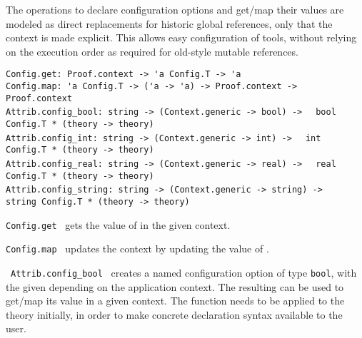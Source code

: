 \begin{isabellebody}
\begin{isamarkuptext}
  The operations to declare configuration options and get/map their
  values are modeled as direct replacements for historic global
  references, only that the context is made explicit.  This allows
  easy configuration of tools, without relying on the execution order
  as required for old-style mutable references.%
\end{isamarkuptext}%
\isamarkuptrue%
%
\isadelimmlref
%
\endisadelimmlref
%
\isatagmlref
%
\begin{isamarkuptext}%
\begin{mldecls}
  \verb|Config.get: Proof.context -> 'a Config.T -> 'a| \\
  \verb|Config.map: 'a Config.T -> ('a -> 'a) -> Proof.context -> Proof.context| \\
  \verb|Attrib.config_bool: string -> (Context.generic -> bool) ->|\isasep\isanewline%
\verb|  bool Config.T * (theory -> theory)| \\
  \verb|Attrib.config_int: string -> (Context.generic -> int) ->|\isasep\isanewline%
\verb|  int Config.T * (theory -> theory)| \\
  \verb|Attrib.config_real: string -> (Context.generic -> real) ->|\isasep\isanewline%
\verb|  real Config.T * (theory -> theory)| \\
  \verb|Attrib.config_string: string -> (Context.generic -> string) ->|\isasep\isanewline%
\verb|  string Config.T * (theory -> theory)| \\
  \end{mldecls}

  \begin{description}

  \item \verb|Config.get|~ gets the value of
   in the given context.

  \item \verb|Config.map|~ updates the context
  by updating the value of .

  \item {}~\verb|Attrib.config_bool|~ creates a named configuration option of type
  \verb|bool|, with the given  depending on the
  application context.  The resulting  can be used to
  get/map its value in a given context.  The  function
  needs to be applied to the theory initially, in order to make
  concrete declaration syntax available to the user.


\end{description}
\end{isamarkuptext}
\end{isabellebody}
